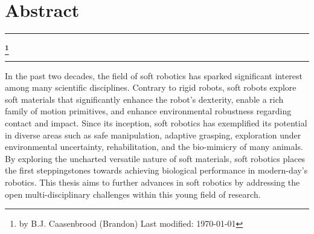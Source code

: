 
\chapter*{\vspace{-45mm}\\ Abstract} %
\vspace{-15mm}
\begin{center}
\rule{\textwidth}{.75pt}\vspace*{1mm}
\textbf{{\large \maintitle}\footnote{by B.J. Caasenbrood (Brandon) \quad Last modified: \today}}
\rule{\textwidth}{.75pt}
\end{center}

\vspace{-3mm}
In the past two decades, the field of soft robotics has sparked significant interest among many scientific disciplines. Contrary to rigid robots, soft robots explore soft materials that significantly enhance the robot's dexterity, enable a rich family of motion primitives, and enhance environmental robustness regarding contact and impact. Since its inception, soft robotics has exemplified its potential in diverse areas such as safe manipulation, adaptive grasping, exploration under environmental uncertainty, rehabilitation, and the bio-mimicry of many animals. By exploring the uncharted versatile nature of soft materials, soft robotics places the first steppingstones towards achieving biological performance in modern-day's robotics. This thesis aims to further advances in soft robotics by addressing the open multi-disciplinary challenges within this young field of research.


